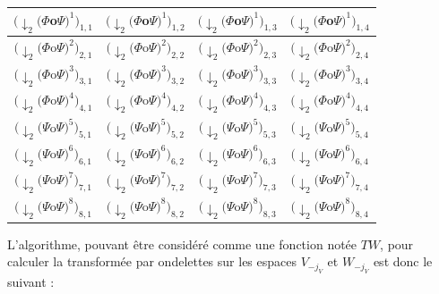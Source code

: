 \documentclass[a4paper,10pt]{report}
\theoremstyle{break}
\begin{document}
\begin{center}
	  \begin{tabular}{| c | c | c | c |}
	      \hline
	      $(\downarrow_2 (\varPhi $o$ \varPsi)^1)_{1,1}$ & $(\downarrow_2 (\varPhi $o$ \varPsi)^1)_{1,2}$ & $(\downarrow_2 (\varPhi $o$ \varPsi)^1)_{1,3}$ & $(\downarrow_2 (\varPhi $o$ \varPsi)^1)_{1,4}$ \\ 
	      \hline
	      $(\downarrow_2 (\varPhi $o$ \varPsi)^2)_{2,1}$ & $(\downarrow_2 (\varPhi $o$ \varPsi)^2)_{2,2}$ & $(\downarrow_2 (\varPhi $o$ \varPsi)^2)_{2,3}$ & $(\downarrow_2 (\varPhi $o$ \varPsi)^2)_{2,4}$ \\
	      \hline
	      $(\downarrow_2 (\varPhi $o$ \varPsi)^3)_{3,1}$ & $(\downarrow_2 (\varPhi $o$ \varPsi)^3)_{3,2}$ & $(\downarrow_2 (\varPhi $o$ \varPsi)^3)_{3,3}$ & $(\downarrow_2 (\varPhi $o$ \varPsi)^3)_{3,4}$ \\ 
	      \hline
	      $(\downarrow_2 (\varPhi $o$ \varPsi)^4)_{4,1}$ & $(\downarrow_2 (\varPhi $o$ \varPsi)^4)_{4,2}$ & $(\downarrow_2 (\varPhi $o$ \varPsi)^4)_{4,3}$ & $(\downarrow_2 (\varPhi $o$ \varPsi)^4)_{4,4}$ \\ 
	      \hline
	      \hline
	      $(\downarrow_2 (\varPsi $o$ \varPsi)^5)_{5,1}$ & $(\downarrow_2 (\varPsi $o$ \varPsi)^5)_{5,2}$ & $(\downarrow_2 (\varPsi $o$ \varPsi)^5)_{5,3}$ & $(\downarrow_2 (\varPsi $o$ \varPsi)^5)_{5,4}$ \\ 
	      \hline
	      $(\downarrow_2 (\varPsi $o$ \varPsi)^6)_{6,1}$ & $(\downarrow_2 (\varPsi $o$ \varPsi)^6)_{6,2}$ & $(\downarrow_2 (\varPsi $o$ \varPsi)^6)_{6,3}$ & $(\downarrow_2 (\varPsi $o$ \varPsi)^6)_{6,4}$ \\ 
	      \hline
	      $(\downarrow_2 (\varPsi $o$ \varPsi)^7)_{7,1}$ & $(\downarrow_2 (\varPsi $o$ \varPsi)^7)_{7,2}$ & $(\downarrow_2 (\varPsi $o$ \varPsi)^7)_{7,3}$ & $(\downarrow_2 (\varPsi $o$ \varPsi)^7)_{7,4}$ \\ 
	      \hline
	      $(\downarrow_2 (\varPsi $o$ \varPsi)^8)_{8,1}$ & $(\downarrow_2 (\varPsi $o$ \varPsi)^8)_{8,2}$ & $(\downarrow_2 (\varPsi $o$ \varPsi)^8)_{8,3}$ & $(\downarrow_2 (\varPsi $o$ \varPsi)^8)_{8,4}$ \\  
	      \hline
	  \end{tabular}

	\end{center}
	
\newpage
	
	L'algorithme, pouvant \^{e}tre consid\'{e}r\'{e} comme une fonction not\'{e}e $TW$, 
	pour calculer la transform\'{e}e par ondelettes sur les espaces $V_{-j_V}$ et $W_{-j_V}$ est donc le suivant :
	
\end{document}
